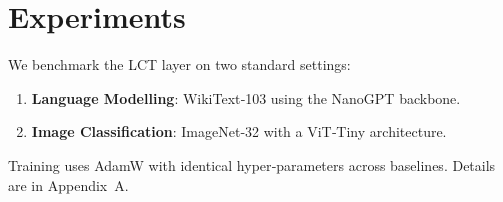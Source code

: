 \section{Experiments}
We benchmark the \textsc{LCT} layer on two standard settings:
\begin{enumerate}
  \item \textbf{Language Modelling}: WikiText‐103 using the NanoGPT backbone.
  \item \textbf{Image Classification}: ImageNet‐32 with a ViT‐Tiny architecture.
\end{enumerate}

Training uses AdamW with identical hyper‐parameters across baselines.  Details are in Appendix~A.